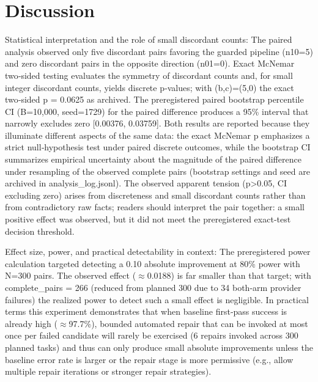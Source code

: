 \documentclass[conference]{IEEEtran}
\begin{document}
\section{Discussion}
Statistical interpretation and the role of small discordant counts: The paired analysis observed only five discordant pairs favoring the guarded pipeline (n10=5) and zero discordant pairs in the opposite direction (n01=0). Exact McNemar two‑sided testing evaluates the symmetry of discordant counts and, for small integer discordant counts, yields discrete p‑values; with (b,c)=(5,0) the exact two‑sided p = 0.0625 as archived. The preregistered paired bootstrap percentile CI (B=10,000, seed=1729) for the paired difference produces a 95\% interval that narrowly excludes zero [0.00376, 0.03759]. Both results are reported because they illuminate different aspects of the same data: the exact McNemar p emphasizes a strict null‑hypothesis test under paired discrete outcomes, while the bootstrap CI summarizes empirical uncertainty about the magnitude of the paired difference under resampling of the observed complete pairs (bootstrap settings and seed are archived in analysis\_log.jsonl). The observed apparent tension (p>0.05, CI excluding zero) arises from discreteness and small discordant counts rather than from contradictory raw facts; readers should interpret the pair together: a small positive effect was observed, but it did not meet the preregistered exact‑test decision threshold.

Effect size, power, and practical detectability in context: The preregistered power calculation targeted detecting a 0.10 absolute improvement at 80\% power with N=300 pairs. The observed effect (\ensuremath{\approx}0.0188) is far smaller than that target; with complete\_pairs = 266 (reduced from planned 300 due to 34 both‑arm provider failures) the realized power to detect such a small effect is negligible. In practical terms this experiment demonstrates that when baseline first‑pass success is already high (\ensuremath{\approx}97.7\%), bounded automated repair that can be invoked at most once per failed candidate will rarely be exercised (6 repairs invoked across 300 planned tasks) and thus can only produce small absolute improvements unless the baseline error rate is larger or the repair stage is more permissive (e.g., allow multiple repair iterations or stronger repair strategies).
\end{document}
